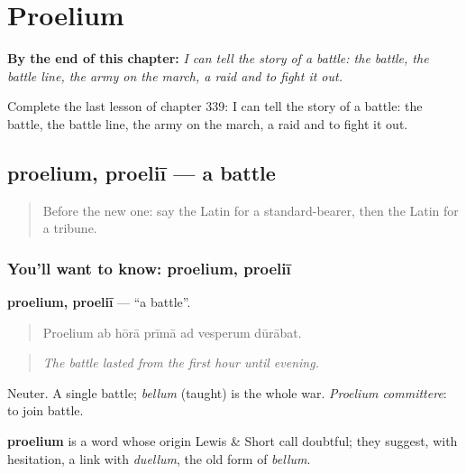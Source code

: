 
\chapter{Proelium}
\label{ch:la-proelium}

\begin{chapteropening}
\textbf{By the end of this chapter:} \emph{I can tell the story of a battle: the battle, the battle line, the army on the march, a raid and to fight it out.}

Complete the last lesson of chapter 339: I can tell the story of a battle: the battle, the battle line, the army on the march, a raid and to fight it out.
\end{chapteropening}

\section[proelium, proeliī]{proelium, proeliī — a battle}

\label{lesson:LA-C339-proelium}



\begin{quote}
Before the new one: say the Latin for a standard-bearer, then the Latin for a tribune.
\end{quote}

\subsection*{You'll want to know: proelium, proeliī}
\textbf{proelium, proeliī} — \textquotedblleft{}a battle\textquotedblright{}.

\begin{quote}
Proelium ab hōrā prīmā ad vesperum dūrābat.
\end{quote}

\begin{quote}
\emph{The battle lasted from the first hour until evening.}
\end{quote}

Neuter. A single battle; \emph{bellum} (taught) is the whole war. \emph{Proelium committere}: to join battle.

\begin{cousinweb}
\textbf{proelium} is a word whose origin Lewis \& Short call doubtful; they suggest, with hesitation, a link with \emph{duellum}, the old form of \emph{bellum}.
\end{cousinweb}

